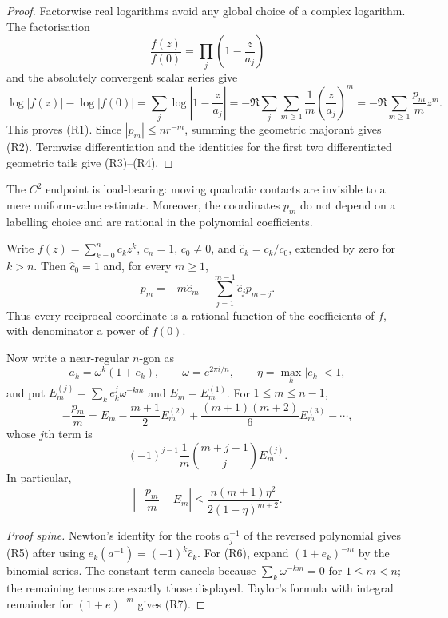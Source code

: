 \begin{proof}
Factorwise real logarithms avoid any global choice of a complex logarithm.
The factorisation
\[
 \frac{f(z)}{f(0)}=\prod_j\left(1-\frac z{a_j}\right)
\]
and the absolutely convergent scalar series give
\[
 \log|f(z)|-\log|f(0)|
 =\sum_j\log\left|1-\frac z{a_j}\right|
 =-\Re\sum_j\sum_{m\ge1}\frac1m
       \left(\frac z{a_j}\right)^m
 =-\Re\sum_{m\ge1}\frac{p_m}{m}z^m.
\]
This proves (R1).  Since $|p_m|\le nr^{-m}$, summing the geometric majorant
gives (R2).  Termwise differentiation and the identities for the first two
differentiated geometric tails give (R3)--(R4).
\end{proof}

The $C^2$ endpoint is load-bearing: moving quadratic contacts are invisible
to a mere uniform-value estimate.  Moreover, the coordinates $p_m$ do not
depend on a labelling choice and are rational in the polynomial
coefficients.

\begin{proposition}
\label{res:reciprocal-rationality}
Write $f(z)=\sum_{k=0}^n c_kz^k$, $c_n=1$, $c_0\ne0$, and
$\widehat c_k=c_k/c_0$, extended by zero for $k>n$.  Then
$\widehat c_0=1$ and, for every $m\ge1$,
\[
 p_m=-m\widehat c_m-
      \sum_{j=1}^{m-1}\widehat c_jp_{m-j}.              \tag{R5}
\]
Thus every reciprocal coordinate is a rational function of the coefficients
of $f$, with denominator a power of $f(0)$.

Now write a near-regular $n$-gon as
\[
 a_k=\omega^k(1+e_k),\qquad
 \omega=e^{2\pi i/n},\qquad \eta=\max_k|e_k|<1,
\]
and put $E_m^{(j)}=\sum_ke_k^j\omega^{-km}$ and
$E_m=E_m^{(1)}$.  For $1\le m\le n-1$,
\[
 -\frac{p_m}{m}
 =E_m-\frac{m+1}{2}E_m^{(2)}
   +\frac{(m+1)(m+2)}6E_m^{(3)}-\cdots,                \tag{R6}
\]
whose $j$th term is
\[
 (-1)^{j-1}\frac1m\binom{m+j-1}{j}E_m^{(j)}.
\]
In particular,
\[
 \left|-\frac{p_m}{m}-E_m\right|
 \le \frac{n(m+1)\eta^2}{2(1-\eta)^{m+2}}.             \tag{R7}
\]
\end{proposition}

\begin{proof}[Proof spine]
Newton's identity for the roots $a_j^{-1}$ of the reversed polynomial gives
(R5) after using
$e_k(a^{-1})=(-1)^k\widehat c_k$.  For (R6), expand
$(1+e_k)^{-m}$ by the binomial series.  The constant term cancels because
$\sum_k\omega^{-km}=0$ for $1\le m<n$; the remaining terms are exactly those
displayed.  Taylor's formula with integral remainder for
$(1+e)^{-m}$ gives (R7).
\end{proof}

